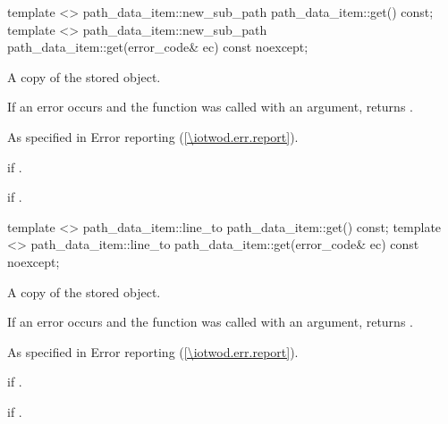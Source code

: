 \begin{itemdecl}
template <>
path_data_item::new_sub_path path_data_item::get() const;
template <>
path_data_item::new_sub_path path_data_item::get(error_code& ec) const noexcept;
\end{itemdecl}
\begin{itemdescr}
\pnum
\returns
A copy of the stored  object.

\pnum
If an error occurs and the function was called with an  argument, returns .

\pnum
\throws
As specified in Error reporting (\ref{\iotwod.err.report}).

\pnum
\errors
{} if .

\pnum
{} if .
\end{itemdescr}

\begin{itemdecl}
template <>
path_data_item::line_to path_data_item::get() const;
template <>
path_data_item::line_to path_data_item::get(error_code& ec) const noexcept;
\end{itemdecl}
\begin{itemdescr}
\pnum
\returns
A copy of the stored  object.

\pnum
If an error occurs and the function was called with an  argument, returns .

\pnum
\throws
As specified in Error reporting (\ref{\iotwod.err.report}).

\pnum
\errors
{} if .

\pnum
{} if .
\end{itemdescr}


